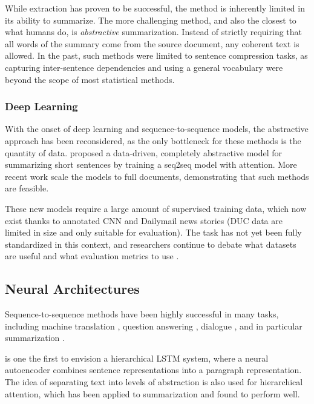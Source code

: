 \documentclass[11pt]{article}
\begin{document}
While extraction has proven to be successful, the method is inherently limited in its ability to summarize. The more challenging method, and also the closest to what humans do, is \emph{abstractive} summarization. Instead of strictly requiring that all words of the summary come from the source document, any coherent text is allowed. In the past, such methods were limited to sentence compression tasks, as capturing inter-sentence dependencies and using a general vocabulary were beyond the scope of most statistical methods.

\subsubsection{Deep Learning}

With the onset of deep learning and sequence-to-sequence models, the abstractive approach has been reconsidered, as the only bottleneck for these methods is the quantity of data. \cite{rush2015neural} proposed a data-driven, completely abstractive model for summarizing short sentences by training a seq2seq model with attention. More recent work \citep{nallapati2016seq2seq, ramachandran2016} scale the models to full documents, demonstrating that such methods are feasible.

These new models require a large amount of supervised training data, which now exist thanks to annotated CNN and Dailymail news stories (DUC data are limited in size and only suitable for evaluation). The task has not yet been fully standardized in this context, and researchers continue to debate what datasets are useful and what evaluation metrics to use \citep{toutanova2016summarymetrics}. 

\subsection{Neural Architectures}

Sequence-to-sequence methods have been highly successful in many tasks, including machine translation \citep{sutskever2014sequence, bahdanau2014neural}, question answering \citep{hermann2015read}, dialogue \citep{li2016persona}, and in particular summarization \citep{rush2015neural}.

\cite{li2015autoencoder} is one the first to envision a hierarchical LSTM system, where a neural autoencoder combines sentence representations into a paragraph representation. The idea of separating text into levels of abstraction is also used for hierarchical attention, which has been applied to summarization \citep{nallapati2016seq2seq} and found to perform well.
\end{document}
